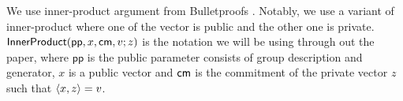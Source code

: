We use inner-product argument from Bulletproofs \cite{bulletproofs}.
Notably, we use a variant of inner-product where one of the vector is public and the other one is private. $\mathsf{InnerProduct}(\mathsf{pp}, x, \mathsf{cm}, v ; z)$ is the notation we will be using through out the paper, where $\mathsf{pp}$ is the public parameter consists of group description and generator, $x$ is a public vector and $\mathsf{cm}$ is the commitment of the private vector $z$ such that $\langle x,z\rangle = v$.

 
